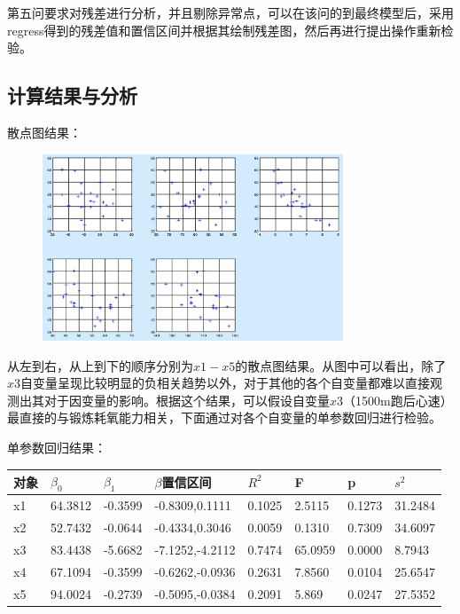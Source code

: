 \documentclass{article}
\begin{document}
第五问要求对残差进行分析，并且剔除异常点，可以在该问的到最终模型后，采用regress得到的残差值和置信区间并根据其绘制残差图，然后再进行提出操作重新检验。

\subsection{计算结果与分析}

散点图结果：

\begin{figure}[H]
    \centering
    \includegraphics[width=0.8\textwidth]{pic1.png}
\end{figure}

从左到右，从上到下的顺序分别为$x1-x5$的散点图结果。从图中可以看出，除了$x3$自变量呈现比较明显的负相关趋势以外，对于其他的各个自变量都难以直接观测出其对于因变量的影响。根据这个结果，可以假设自变量$x3$（1500m跑后心速）最直接的与锻炼耗氧能力相关，下面通过对各个自变量的单参数回归进行检验。

单参数回归结果：

\begin{table}[H]
\centering
\begin{tabular}{|l|l|l|l|l|l|l|l|}
\hline
对象 &$\beta_0$&$\beta_1$&$\beta$置信区间&$R^2$&F&p&$s^2$\\ \hline
x1 & 64.3812 & -0.3599 & -0.8309,0.1111  & 0.1025 & 2.5115  & 0.1273 & 31.2484 \\ \hline
x2 & 52.7432 & -0.0644 & -0.4334,0.3046  & 0.0059 & 0.1310  & 0.7309 & 34.6097 \\ \hline
x3 & 83.4438 & -5.6682 & -7.1252,-4.2112 & 0.7474 & 65.0959 & 0.0000 & 8.7943  \\ \hline
x4 & 67.1094 & -0.3599 & -0.6262,-0.0936 & 0.2631 & 7.8560  & 0.0104 & 25.6547 \\ \hline
x5 & 94.0024 & -0.2739 & -0.5095,-0.0384 & 0.2091 & 5.869   & 0.0247 & 27.5352 \\ \hline
\end{tabular}
\end{table}
\end{document}
